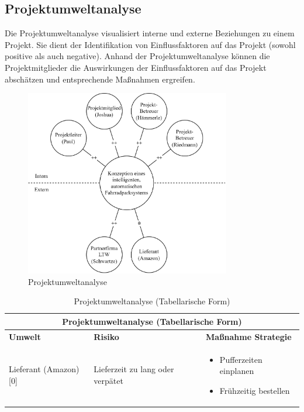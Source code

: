 \subsection{Projektumweltanalyse}

Die Projektumweltanalyse visualisiert interne und externe Beziehungen zu einem Projekt. Sie dient der Identifikation von Einflussfaktoren auf das Projekt (sowohl positive als auch negative). Anhand der Projektumweltanalyse können die Projektmitglieder die Auswirkungen der Einflussfaktoren auf das Projekt abschätzen und entsprechende Maßnahmen ergreifen. 

\begin{figure}[H]
    \centering
    \includegraphics[width=0.8\textwidth]{images/projektumweltanalyse.png}
    \caption{Projektumweltanalyse}
    \label{fig:projektumweltanalyse}
\end{figure}

\begin{table}
    \centering
    \begin{tabular}{lp{}p{}}
        \multicolumn{3}{c}{\textbf{Projektumweltanalyse (Tabellarische Form)}}                  \\
        \toprule
        \textbf{Umwelt}        & \textbf{Risiko}                  & \textbf{Maßnahme Strategie} \\
        \midrule
        Lieferant (Amazon) [0] & Lieferzeit zu lang oder verpätet & \begin{itemize}
                                                                        \item Pufferzeiten einplanen
                                                                        \item Frühzeitig bestellen
                                                                    \end{itemize} \\
        \bottomrule
    \end{tabular}
    \caption{Projektumweltanalyse (Tabellarische Form)}
    \label{tab:projektumweltanalyse}
\end{table}